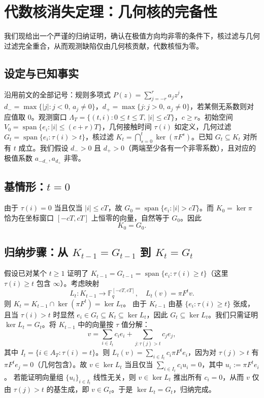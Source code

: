 \documentclass[11pt,a4paper]{ctexart}
\newcommand{\F}{\mathbb{F}}
\DeclareMathOperator{\spanop}{span}
\begin{document}
\section{代数核消失定理：几何核的完备性}

我们现给出一个严谨的归纳证明，确认在极值方向均非零的条件下，核过滤与几何过滤完全重合，从而观测缺陷仅由几何核贡献，代数核恒为零。

\subsection{设定与已知事实}
沿用前文的全部记号：规则多项式 \(P(z)=\sum_{j=-r}^r a_jz^j\)，\(d_-=\max\{|j|:j<0,\,a_j\neq 0\}\)，\(d_+=\max\{j:j>0,\,a_j\neq 0\}\)，若某侧无系数则对应值取 \(0\)。观测窗口 \(\Lambda_T=\{(t,i):0\le t\le T,\,|i|\le cT\}\)，\(c\ge r\)。初始空间 \(V_0=\spanop\{e_i:|i|\le (c+r)T\}\)，几何接触时间 \(\tau(i)\) 如定义，几何过滤 \(G_t=\spanop\{e_i:\tau(i)>t\}\)，核过滤 \(K_t=\bigcap_{s=0}^t\ker(\pi F^s)\)。已知 \(G_t\subseteq K_t\) 对所有 \(t\) 成立。我们假设 \(d_->0\) 且 \(d_+>0\)（两端至少各有一个非零系数），且对应的极值系数 \(a_{-d_-},a_{d_+}\) 非零。

\subsection{基情形：\(t=0\)}
由于 \(\tau(i)=0\) 当且仅当 \(|i|\le cT\)，故 \(G_0=\spanop\{e_i:|i|>cT\}\)。而 \(K_0=\ker\pi\) 恰为在坐标窗口 \([-cT,cT]\) 上恒零的向量，自然等于 \(G_0\)。因此
\begin{equation}
  K_0=G_0.
\end{equation}

\subsection{归纳步骤：从 \(K_{t-1}=G_{t-1}\) 到 \(K_t=G_t\)}
假设已对某个 \(t\ge 1\) 证明了 \(K_{t-1}=G_{t-1}=\spanop\{e_i:\tau(i)\ge t\}\)（这里 \(\tau(i)\ge t\) 包含 \(\infty\)）。考虑映射
\[
  L_t: K_{t-1} \to \F_q^{[-cT,cT]},\quad L_t(v)=\pi F^t v.
\]
则 \(K_t = K_{t-1}\cap\ker(\pi F^t)=\ker L_t\)。
由于 \(K_{t-1}\) 由基 \(\{e_i:\tau(i)\ge t\}\) 张成，且当 \(\tau(i)>t\) 时显然 \(e_i\in G_t\subseteq K_t\subseteq\ker L_t\)，因此 \(G_t\subseteq\ker L_t\)。我们只需证明 \(\ker L_t = G_t\)。将 \(K_{t-1}\) 中的向量按 \(\tau\) 值分解：
\[
  v = \sum_{i\in I_t} c_i e_i + \sum_{j:\tau(j)>t} c_j e_j,
\]
其中 \(I_t=\{i\in A_T:\tau(i)=t\}\)。则 \(L_t(v)=\sum_{i\in I_t} c_i \pi F^t e_i\)，因为对 \(\tau(j)>t\) 有 \(\pi F^t e_j=0\)（几何包含）。故 \(v\in\ker L_t\) 当且仅当 \(\sum_{i\in I_t} c_i u_i =0\)，其中 \(u_i:=\pi F^t e_i\)。
若能证明向量组 \(\{u_i\}_{i\in I_t}\) 线性无关，则 \(v\in\ker L_t\) 推出所有 \(c_i=0\)，从而 \(v\) 仅由 \(\tau(j)>t\) 的基生成，即 \(v\in G_t\)。于是 \(\ker L_t=G_t\)，归纳完成。
\end{document}
